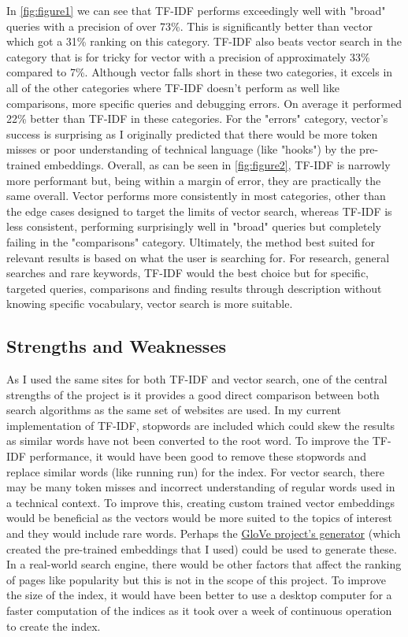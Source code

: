 \documentclass[12pt,a4paper]{article}
\begin{document}
In \autoref{fig:figure1} we can see that TF-IDF performs exceedingly well with
"broad" queries with a precision of over 73\%. This is significantly better than
vector which got a 31\% ranking on this category. TF-IDF also beats vector
search in the category that is for tricky for vector with a precision of
approximately 33\% compared to 7\%. Although vector falls short in these two
categories, it excels in all of the other categories where TF-IDF doesn't
perform as well like comparisons, more specific queries and debugging errors. On
average it performed 22\% better than TF-IDF in these categories. For the
"errors" category, vector's success is surprising as I originally predicted that
there would be more token misses or poor understanding of technical language
(like "hooks") by the pre-trained embeddings. Overall, as can be seen in
\autoref{fig:figure2}, TF-IDF is narrowly more performant but, being within a
margin of error, they are practically the same overall. Vector performs more
consistently in most categories, other than the edge cases designed to target
the limits of vector search, whereas TF-IDF is less consistent, performing
surprisingly well in "broad" queries but completely failing in the "comparisons"
category. Ultimately, the method best suited for relevant results is based on
what the user is searching for. For research, general searches and rare
keywords, TF-IDF would the best choice but for specific, targeted queries,
comparisons and finding results through description without knowing specific
vocabulary, vector search is more suitable.

\subsection*{Strengths and Weaknesses}

As I used the same sites for both TF-IDF and vector search, one of the central
strengths of the project is it provides a good direct comparison between both
search algorithms as the same set of websites are used. In my current
implementation of TF-IDF, stopwords are included which could skew the results as
similar words have not been converted to the root word. To improve the TF-IDF
performance, it would have been good to remove these stopwords and replace
similar words (like running \textrightarrow \space run) for the index. For
vector search, there may be many token misses and incorrect understanding of
regular words used in a technical context. To improve this, creating custom
trained vector embeddings would be beneficial as the vectors would be more
suited to the topics of interest and they would include rare words. Perhaps the
\href{https://github.com/stanfordnlp/GloVe}{GloVe project's generator} (which
created the pre-trained embeddings that I used) could be used to generate these.
In a real-world search engine, there would be other factors that affect the
ranking of pages like popularity but this is not in the scope of this project.
To improve the size of the index, it would have been better to use a desktop
computer for a faster computation of the indices as it took over a week of
continuous operation to create the index.
\end{document}
